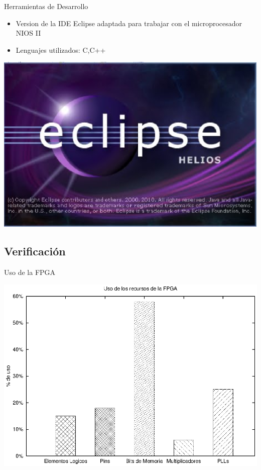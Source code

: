 \documentclass[xcolor=dvipsnames]{beamer}
\begin{document}
\begin{frame}{Herramientas de Desarrollo}
\begin{block}
    \begin{itemize}
      \scriptsize
     	\item Version de la IDE Eclipse adaptada para trabajar con el microprocesador NIOS II
	\item Lenguajes utilizados: C,C++
    \end{itemize}
	\center	
	\includegraphics[scale=0.10]{figures/eclipse.eps}  	
  \end{block}
\end{frame}

\subsection{Verificación}

\begin{frame}{Uso de la FPGA}

	\center	
	\includegraphics[scale=0.70]{figures/fpga.eps}  

\end{frame}
\end{document}
